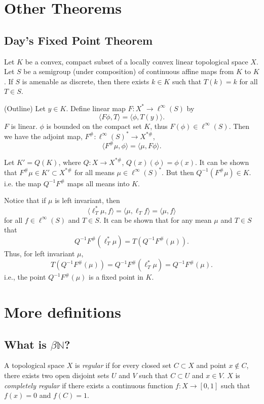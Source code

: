 \documentclass[12pt]{report}
\begin{document}
\chapter{Other Theorems}
\section{Day's Fixed Point Theorem}

\begin{theorem}
Let $K$ be a convex, compact subset of a locally convex linear topological space $X$.
Let $S$ be a semigroup (under composition) of continuous affine maps from $K$ to $K$.
If $S$ is amenable as discrete, then there exists $k\in K$ such that $T(k) = k$
for all $T\in S$.
\end{theorem}
\proof (Outline)
Let $y\in K$.  Define linear map $F:X^*\rightarrow \ell^\infty(S)$ by
\[
\langle F\phi,T\rangle = \langle \phi, T(y)\rangle.
\]
$F$ is linear.  $\phi$ is bounded on the compact set $K$, thus $F(\phi)\in \ell^\infty(S)$.
Then we have the adjoint map, $F^\#: \ell^\infty(S)^*\rightarrow X^{*\#}$,
\[
\langle F^\# \mu,\phi\rangle = \langle \mu, F\phi\rangle.
\]

Let $K' = Q(K)$, where $Q:X\rightarrow X^{*\#}$, $Q(x)(\phi) = \phi(x)$.  It can be shown
that $F^\# \mu \in K'\subset X^{*\#}$ for all means $\mu\in\ell^\infty(S)^*$.
But then $Q^{-1}(F^\#\mu) \in K$.  i.e. the map $Q^{-1}F^\#$ maps all means into $K$.

Notice that if $\mu$ is left invariant, then
\[
\langle \ell_T^* \mu, f\rangle = \langle \mu, \ell_T f\rangle = \langle\mu,f\rangle
\]
for all $f\in \ell^\infty(S)$ and $T\in S$.
It can be shown that for any mean $\mu$ and $T\in S$ that
\[
Q^{-1}F^\#(\ell_T^*\mu) = T(Q^{-1}F^\#(\mu)).
\]
Thus, for left invariant $\mu$,
\[
T(Q^{-1}F^\#(\mu)) = Q^{-1}F^\#(\ell_T^*\mu) = Q^{-1}F^\#(\mu).
\]
i.e., the point $Q^{-1}F^\#(\mu)$ is a fixed point in $K$.
\done

\chapter{More definitions}

\section{What is $\beta\mathbb{N}$?}

\begin{defn}
A topological space $X$ is {\it regular} if for every closed set $C\subset X$ and point $x\not\in C$,
there exists two open disjoint sets $U$ and $V$ such that $C\subset U$ and $x\in V$.
$X$ is {\it completely regular} if there exists a continuous function $f:X\rightarrow [0,1]$ such that
$f(x) = 0$ and $f(C) = 1$.
\end{defn}
\end{document}
